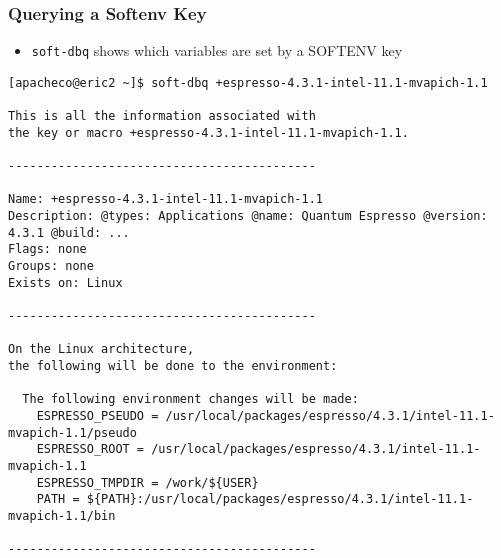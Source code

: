 \documentclass[slidestop,mathserif,compress,xcolor=svgnames,table]{beamer}
\begin{document}
\begin{frame}[fragile]
\frametitle{\small Querying a Softenv Key}
\begin{itemize}
\item \texttt{soft-dbq} shows which variables are set by a SOFTENV key
\end{itemize}
{\tiny
\begin{alertblock}{}
\begin{verbatim}
[apacheco@eric2 ~]$ soft-dbq +espresso-4.3.1-intel-11.1-mvapich-1.1

This is all the information associated with
the key or macro +espresso-4.3.1-intel-11.1-mvapich-1.1.

-------------------------------------------

Name: +espresso-4.3.1-intel-11.1-mvapich-1.1
Description: @types: Applications @name: Quantum Espresso @version: 4.3.1 @build: ...
Flags: none
Groups: none
Exists on: Linux 

-------------------------------------------

On the Linux architecture,
the following will be done to the environment:

  The following environment changes will be made:
    ESPRESSO_PSEUDO = /usr/local/packages/espresso/4.3.1/intel-11.1-mvapich-1.1/pseudo
    ESPRESSO_ROOT = /usr/local/packages/espresso/4.3.1/intel-11.1-mvapich-1.1
    ESPRESSO_TMPDIR = /work/${USER}
    PATH = ${PATH}:/usr/local/packages/espresso/4.3.1/intel-11.1-mvapich-1.1/bin

-------------------------------------------

\end{verbatim}
\end{alertblock}
}
\end{frame}
\end{document}
